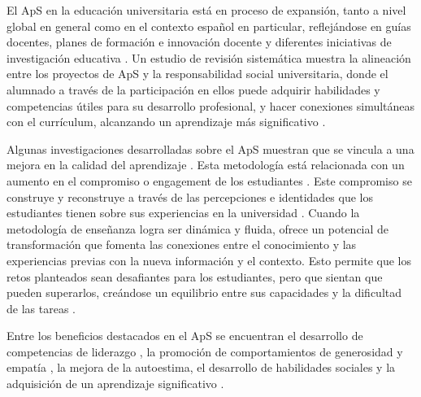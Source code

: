 \documentclass[spanish]{textolivre}
\begin{document}
El ApS en la educación universitaria está en proceso de expansión, tanto a nivel global en general como en el contexto español en particular, reflejándose en guías docentes, planes de formación e innovación docente y diferentes iniciativas de investigación educativa \cite{chiva-bartoll_aprendizaje-servicio_2018}. Un estudio de revisión sistemática muestra la alineación entre los proyectos de ApS y la responsabilidad social universitaria, donde el alumnado a través de la participación en ellos puede adquirir habilidades y competencias útiles para su desarrollo profesional, y hacer conexiones simultáneas con el currículum, alcanzando un aprendizaje más significativo \cite{opazo_review_2016}.

Algunas investigaciones desarrolladas sobre el ApS muestran que se vincula a una mejora en la calidad del aprendizaje \cite{aramburuzabala_embedding_2019}. Esta metodología está relacionada con un aumento en el compromiso o engagement de los estudiantes \cite{marco-gardoqui_impact_2020}. Este compromiso se construye y reconstruye a través de las percepciones e identidades que los estudiantes tienen sobre sus experiencias en la universidad \cite{manzano-leon_testing_2021}. Cuando la metodología de enseñanza logra ser dinámica y fluida, ofrece un potencial de transformación que fomenta las conexiones entre el conocimiento y las experiencias previas con la nueva información y el contexto. Esto permite que los retos planteados sean desafiantes para los estudiantes, pero que sientan que pueden superarlos, creándose un equilibrio entre sus capacidades y la dificultad de las tareas \cite{brown_conceptual_2022}.

Entre los beneficios destacados en el ApS se encuentran el desarrollo de competencias de liderazgo \cite{celio_meta-analysis_2011}, la promoción de comportamientos de generosidad y empatía \cite{mesurado_hero_2018}, la mejora de la autoestima, el desarrollo de habilidades sociales \cite{saylor_effects_2018} y la adquisición de un aprendizaje significativo \cite{richards_experiential_2014}.
\end{document}
